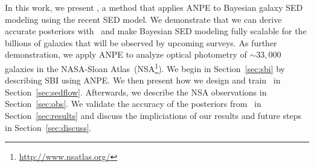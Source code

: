 In this work, we present \sedflow, a method that applies ANPE to Bayesian
galaxy SED modeling using the recent \cite{hahn2022} SED model. 
We demonstrate that we can derive accurate posteriors with \sedflow~and make
Bayesian SED modeling fully scalable for the billions of galaxies that will be
observed by upcoming surveys.
As further demonstration, we apply ANPE to analyze optical photometry of
${\sim}33,000$ galaxies in the NASA-Sloan
Atlas~(NSA\footnote{\url{http://www.nsatlas.org/}}). 
We begin in Section~\ref{sec:sbi} by describing SBI using ANPE.
We then present how we design and train \sedflow~in Section~\ref{sec:sedflow}.
Afterwards, we describe the NSA observations in Section~\ref{sec:obs}. 
We validate the accuracy of the posteriors from \sedflow~in
Section~\ref{sec:results} and discuss the impliciations of our results and
future steps in Section~\ref{sec:discuss}. 

